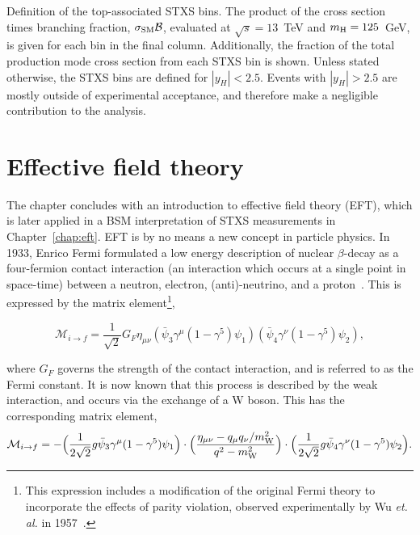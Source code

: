 \begin{table}
    \caption[Top-associated STXS bin definitions]{Definition of the top-associated STXS bins. The product of the cross section times \Hgg branching fraction, $\sigma_{\rm{SM}}\mathcal{B}$, evaluated at $\sqrt{s}=13$~TeV and $m_{\rm{H}}=125$~GeV, is given for each bin in the final column. Additionally, the fraction of the total production mode cross section from each STXS bin is shown. Unless stated otherwise, the STXS bins are defined for $|y_H|<2.5$. Events with $|y_H|>2.5$ are mostly outside of experimental acceptance, and therefore make a negligible contribution to the \Hgg analysis.}
    \label{tab:top_definitions}
    \centering
    \scriptsize
    \renewcommand{\arraystretch}{1.5}
    \setlength{\tabcolsep}{5pt}
    
\end{table}

\FloatBarrier

\section{Effective field theory}\label{sec:theory_eft}
The chapter concludes with an introduction to effective field theory (EFT), which is later applied in a BSM interpretation of STXS measurements in Chapter~\ref{chap:eft}. EFT is by no means a new concept in particle physics. In 1933, Enrico Fermi formulated a low energy description of nuclear $\beta$-decay as a four-fermion contact interaction (an interaction which occurs at a single point in space-time) between a neutron, electron, (anti)-neutrino, and a proton~\cite{Fermi:1933jpa}. This is expressed by the matrix element\footnote{This expression includes a modification of the original Fermi theory to incorporate the effects of parity violation, observed experimentally by Wu \textit{et. al.} in 1957~\cite{PhysRev.105.1413}.},

\begin{equation}\label{eq:fermi_theory}
    \mathcal{M}_{i \rightarrow f} = \frac{1}{\sqrt{2}}G_F \eta_{\mu\nu} (\bar{\psi}_3 \gamma^\mu(1-\gamma^5) \psi_1)(\bar{\psi}_4 \gamma^\nu(1-\gamma^5) \psi_2),
\end{equation}

\noindent
where $G_F$ governs the strength of the contact interaction, and is referred to as the Fermi constant. It is now known that this process is described by the weak interaction, and occurs via the exchange of a W boson. This has the corresponding matrix element,
\begin{equation}
    \mathcal{M}_{i \rightarrow f} = -\Big( \frac{1}{2\sqrt{2}}g\bar{\psi}_3 \gamma^\mu(1-\gamma^5) \psi_1 \Big) \cdot \Big( \frac{\eta_{\mu\nu}-q_{\mu}q_\nu/m_{\rm{W}}^2}{q^2-m_{\rm{W}}^2} \Big) \cdot \Big( \frac{1}{2\sqrt{2}}g\bar{\psi}_4 \gamma^\nu(1-\gamma^5) \psi_2 \Big).
\end{equation}

